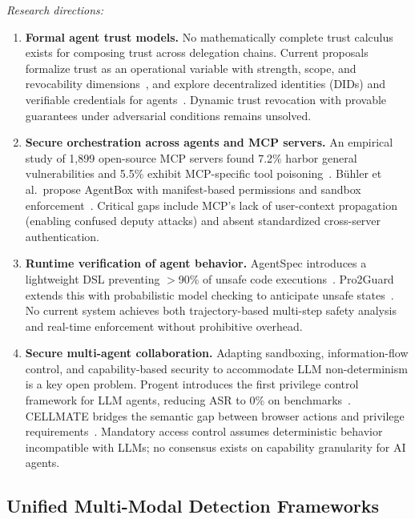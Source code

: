 \emph{Research directions:}
\begin{enumerate}[nosep,leftmargin=1.5em]
    \item \textbf{Formal agent trust models.} No mathematically complete trust calculus exists for composing trust across delegation chains. Current proposals formalize trust as an operational variable with strength, scope, and revocability dimensions~\cite{trustparadox2025}, and explore decentralized identities (DIDs) and verifiable credentials for agents~\cite{rodriguez2025did}. Dynamic trust revocation with provable guarantees under adversarial conditions remains unsolved.
    \item \textbf{Secure orchestration across agents and MCP servers.} An empirical study of 1,899 open-source MCP servers found 7.2\% harbor general vulnerabilities and 5.5\% exhibit MCP-specific tool poisoning~\cite{hasan2025mcpglance}. B\"uhler et al.\ propose AgentBox with manifest-based permissions and sandbox enforcement~\cite{buhler2025agentbox}. Critical gaps include MCP's lack of user-context propagation (enabling confused deputy attacks) and absent standardized cross-server authentication.
    \item \textbf{Runtime verification of agent behavior.} AgentSpec introduces a lightweight DSL preventing $>$90\% of unsafe code executions~\cite{wang2025agentspec}. Pro2Guard extends this with probabilistic model checking to anticipate unsafe states~\cite{pro2guard2025}. No current system achieves both trajectory-based multi-step safety analysis and real-time enforcement without prohibitive overhead.
    \item \textbf{Secure multi-agent collaboration.} Adapting sandboxing, information-flow control, and capability-based security to accommodate LLM non-determinism is a key open problem. Progent introduces the first privilege control framework for LLM agents, reducing ASR to 0\% on benchmarks~\cite{shi2025progent}. CELLMATE bridges the semantic gap between browser actions and privilege requirements~\cite{meng2025cellmate}. Mandatory access control assumes deterministic behavior incompatible with LLMs; no consensus exists on capability granularity for AI agents.
\end{enumerate}


\subsection{Unified Multi-Modal Detection Frameworks}
\label{sec:future-detection}

